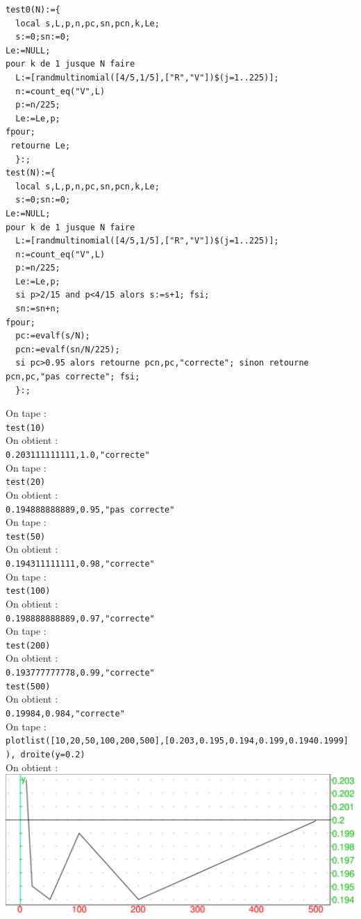 \documentclass[a4paper,11pt]{book}
\begin{document}
\begin{verbatim}
test0(N):={
  local s,L,p,n,pc,sn,pcn,k,Le;
  s:=0;sn:=0;
Le:=NULL;
pour k de 1 jusque N faire
  L:=[randmultinomial([4/5,1/5],["R","V"])$(j=1..225)];
  n:=count_eq("V",L)
  p:=n/225;
  Le:=Le,p;
fpour;
 retourne Le;
  }:;
test(N):={
  local s,L,p,n,pc,sn,pcn,k,Le;
  s:=0;sn:=0;
Le:=NULL;
pour k de 1 jusque N faire
  L:=[randmultinomial([4/5,1/5],["R","V"])$(j=1..225)];
  n:=count_eq("V",L)
  p:=n/225;
  Le:=Le,p;
  si p>2/15 and p<4/15 alors s:=s+1; fsi;
  sn:=sn+n;
fpour;
  pc:=evalf(s/N);
  pcn:=evalf(sn/N/225);
  si pc>0.95 alors retourne pcn,pc,"correcte"; sinon retourne pcn,pc,"pas correcte"; fsi;
  }:;
\end{verbatim}
On tape :\\
{\tt test(10)}\\
On obtient :\\
{\tt 0.203111111111,1.0,"correcte"}\\
On tape :\\
{\tt test(20)}\\
On obtient :\\
{\tt 0.194888888889,0.95,"pas correcte"}\\
On tape :\\
{\tt test(50)}\\
On obtient :\\
{\tt 0.194311111111,0.98,"correcte"}\\
On tape :\\
{\tt test(100)}\\
On obtient :\\
{\tt 0.198888888889,0.97,"correcte"}\\
On tape :\\
{\tt test(200)}\\
On obtient :\\
{\tt 0.193777777778,0.99,"correcte"}\\
{\tt test(500)}\\
On obtient :\\
{\tt 0.19984,0.984,"correcte"}\\
On tape :\\
{\tt plotlist([10,20,50,100,200,500],[0.203,0.195,0.194,0.199,0.1940.1999] ),
droite(y=0.2)}\\
On obtient :\\
\includegraphics[width=\textwidth]{statconv}
\end{document}
